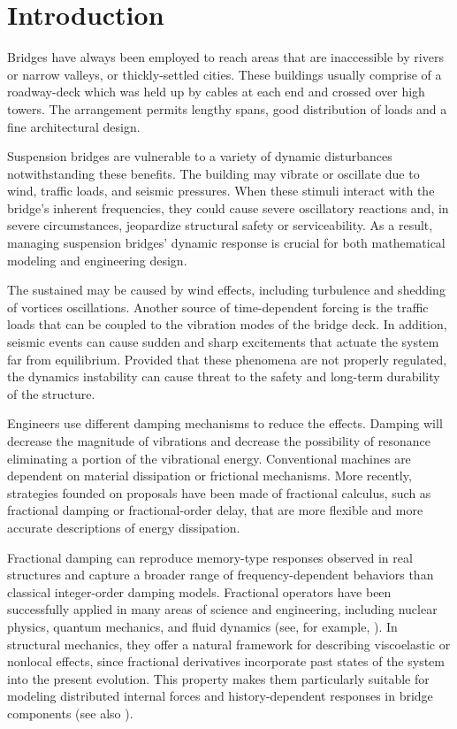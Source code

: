 \documentclass[12pt]{article}
\numberwithin{equation}{section}
\begin{document}
\section{ Introduction}
Bridges have always been employed to reach areas that are inaccessible by rivers or narrow valleys, or thickly-settled cities. These buildings usually comprise of a roadway-deck which was held up by cables at each end and crossed over high towers. The arrangement permits lengthy spans, good distribution of loads and a fine architectural design.

Suspension bridges are vulnerable to a variety of dynamic disturbances notwithstanding these benefits. The building may vibrate or oscillate due to wind, traffic loads, and seismic pressures. When these stimuli interact with the bridge's inherent frequencies, they could cause severe oscillatory reactions and, in severe circumstances, jeopardize structural safety or serviceability. As a result, managing suspension bridges' dynamic response is crucial for both mathematical modeling and engineering design.

The sustained may be caused by wind effects, including turbulence and shedding of vortices 
oscillations. Another source of time-dependent forcing is the traffic loads that can be coupled to the vibration modes of the bridge deck. In addition,
seismic events can cause sudden and sharp excitements that actuate the system
far from equilibrium. Provided that these phenomena are not properly regulated, the
dynamics instability can cause threat to the safety and long-term durability
of the structure.

Engineers use different damping mechanisms to reduce the effects.
Damping will decrease the magnitude of vibrations and decrease the possibility of resonance eliminating a portion of the vibrational energy. Conventional machines are dependent on material
dissipation or frictional mechanisms. More recently, strategies founded on
proposals have been made of fractional calculus, such as fractional damping or
fractional-order delay, that are more flexible and more accurate descriptions of
energy dissipation.

Fractional damping can reproduce memory-type responses observed in real
structures and capture a broader range of frequency-dependent behaviors than
classical integer-order damping models. Fractional operators have been
successfully applied in many areas of science and engineering, including nuclear
physics, quantum mechanics, and fluid dynamics (see, for example,
\cite{MainBo,Pod,TorBa}). In structural mechanics, they offer a natural framework
for describing viscoelastic or nonlocal effects, since fractional derivatives
incorporate past states of the system into the present evolution. This property
makes them particularly suitable for modeling distributed internal forces and
history-dependent responses in bridge components (see also \cite{RosSh}).
\end{document}
